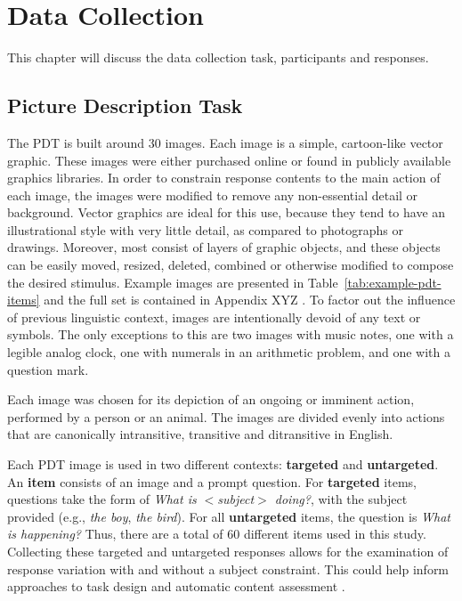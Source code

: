 \chapter{Data Collection}

This chapter will discuss the data collection task, participants and responses.

\section{Picture Description Task}
\label{sec:pdt}


The PDT is built around 30 images. Each image is a simple, cartoon-like vector graphic. These images were either purchased online or found in publicly available graphics libraries. In order to constrain response contents to the main action of each image, the images were modified to remove any non-essential detail or background. Vector graphics are ideal for this use, because they tend to have an illustrational style with very little detail, as compared to photographs or drawings. Moreover, most consist of layers of graphic objects, and these objects can be easily moved, resized, deleted, combined or otherwise modified to compose the desired stimulus. Example images are presented in Table~\ref{tab:example-pdt-items} and the full set is contained in Appendix XYZ . To factor out the influence of previous linguistic context, images are intentionally devoid of any text or symbols. The only exceptions to this are two images with music notes, one with a legible analog clock, one with numerals in an arithmetic problem, and one with a question mark.

Each image was chosen for its depiction of an ongoing or imminent action, performed by a person or an animal. The images are divided evenly into actions that are canonically intransitive, transitive and ditransitive in English.

Each PDT image is used in two different contexts: \textbf{targeted} and \textbf{untargeted}. An \textbf{item} consists of an image and a prompt question. For \textbf{targeted} items, questions take the form of \textit{What is $<$subject$>$ doing?}, with the subject provided (e.g., \textit{the boy}, \textit{the bird}). For all \textbf{untargeted} items, the question is \textit{What is happening?} Thus, there are a total of 60 different items used in this study. Collecting these targeted and untargeted responses allows for the examination of response variation with and without a subject constraint. This could help inform approaches to task design and automatic content assessment \citep{foster2009native, cho2013investigating}. 

